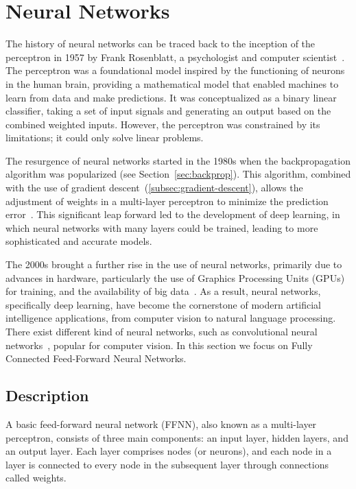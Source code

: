 \chapter{Neural Networks}\label{ch:neural-networks}
The history of neural networks can be traced back to the inception of the perceptron in 1957 by Frank Rosenblatt, a psychologist and computer scientist~\cite{rosenblatt1958perceptron}. The perceptron was a foundational model inspired by the functioning of neurons in the human brain, providing a mathematical model that enabled machines to learn from data and make predictions. It was conceptualized as a binary linear classifier, taking a set of input signals and generating an output based on the combined weighted inputs. However, the perceptron was constrained by its limitations; it could only solve linear problems.
\par The resurgence of neural networks started in the 1980s when the backpropagation algorithm was popularized (see Section~\ref{sec:backprop}). This algorithm, combined with the use of gradient descent~(\ref{subsec:gradient-descent}), allows the adjustment of weights in a multi-layer perceptron to minimize the prediction error~\cite{rumelhart1986learning}. This significant leap forward led to the development of deep learning, in which neural networks with many layers could be trained, leading to more sophisticated and accurate models.
\par The 2000s brought a further rise in the use of neural networks, primarily due to advances in hardware, particularly the use of Graphics Processing Units (GPUs) for training, and the availability of big data~\cite{schmidhuber2015deep}. As a result, neural networks, specifically deep learning, have become the cornerstone of modern artificial intelligence applications, from computer vision to natural language processing. There exist different kind of neural networks, such as convolutional neural networks~\cite{lecun1995convolutional}, popular for computer vision. In this section we focus on Fully Connected Feed-Forward Neural Networks. 
\section{Description}
A basic feed-forward neural network (FFNN), also known as a multi-layer perceptron, consists of three main components: an input layer, hidden layers, and an output layer. Each layer comprises nodes (or neurons), and each node in a layer is connected to every node in the subsequent layer through connections called weights.

